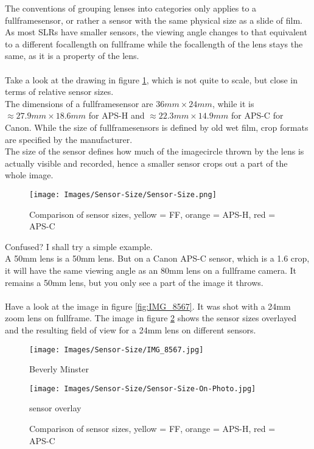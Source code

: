 The conventions of grouping lenses into categories only applies to a \gls{fullframesensor}, or rather a \gls{sensor} with the same physical size as a slide of film. As most \glspl{SLR} have smaller \glspl{sensor}, the viewing angle changes to that equivalent to a different \gls{focallength} on \gls{fullframe} while the \gls{focallength} of the lens stays the same, as it is a property of the lens.
\\
\\
Take a look at the drawing in figure \ref{fig:Sensor-Size}, which is not quite to scale, but close in terms of relative \gls{sensor} sizes.
\\
The dimensions of a \gls{fullframesensor} are $36mm \times 24mm$, while it is $\approx 27.9mm \times 18.6mm$ for \gls{APS-H} and $\approx 22.3mm \times 14.9mm$ for \gls{APS-C} for Canon. While the size of \glspl{fullframesensor} is defined by old wet film, \gls{crop} formats are specified by the manufacturer.
\\
The size of the sensor defines how much of the \gls{imagecircle} thrown by the lens is actually visible and recorded, hence a smaller \gls{sensor} crops out a part of the whole image.

\begin{figure}[htbp]
	\centering
		\texttt{[image: Images/Sensor-Size/Sensor-Size.png]}
	\caption{Comparison of sensor sizes, yellow = \gls{FF}, orange = \gls{APS-H}, red = \gls{APS-C}}
	\label{fig:Sensor-Size}
\end{figure}

Confused? I shall try a simple example.
\\
A 50mm lens is a 50mm lens. But on a Canon \gls{APS-C} \gls{sensor}, which is a 1.6 \gls{crop}, it will have the same viewing angle as an 80mm lens on a \gls{fullframe} camera. It remains a 50mm lens, but you only see a part of the image it throws.
\\
\\
Have a look at the image in figure \ref{fig:IMG_8567}. It was shot with a 24mm \gls{zoom} lens on \gls{fullframe}. The image in figure \ref{fig:Sensor-Size-On-Photo} shows the \gls{sensor} sizes overlayed and the resulting field of view for a 24mm lens on different sensors.

\begin{figure}[htb]
\centering
\begin{minipage}{.4\textwidth}
	\centering
		\texttt{[image: Images/Sensor-Size/IMG\_8567.jpg]}
	\caption{Beverly Minster}
	\label{fig:IMG_8567}
\end{minipage}
\begin{minipage}{.4\textwidth}
	\centering
		\texttt{[image: Images/Sensor-Size/Sensor-Size-On-Photo.jpg]}
	\caption{sensor overlay}
	\label{fig:Sensor-Size-On-Photo}
\end{minipage}
\caption*{Comparison of sensor sizes, yellow = \gls{FF}, orange = \gls{APS-H}, red = \gls{APS-C}}
\end{figure}

